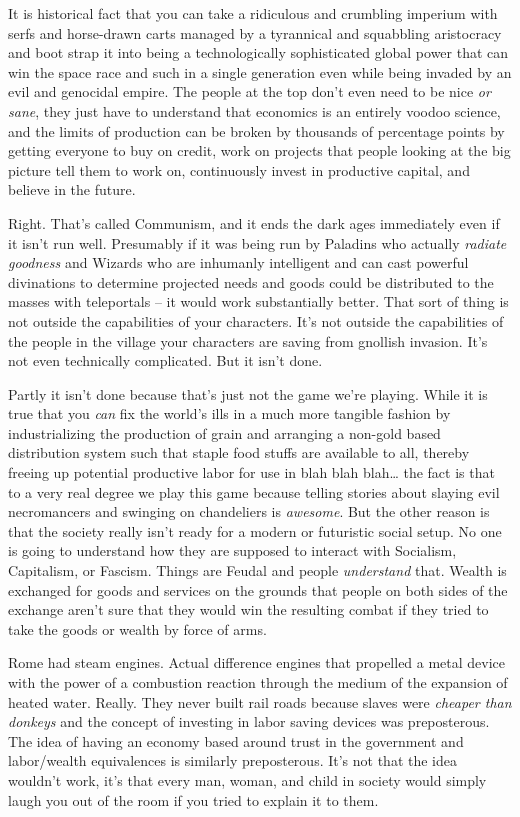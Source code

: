 It is historical fact that you can take a ridiculous and crumbling imperium with serfs and horse-drawn carts managed by a tyrannical and squabbling aristocracy and boot strap it into being a technologically sophisticated global power that can win the space race and such in a single generation even while being invaded by an evil and genocidal empire. The people at the top don't even need to be nice \textit{or sane}, they just have to understand that economics is an entirely voodoo science, and the limits of production can be broken by thousands of percentage points by getting everyone to buy on credit, work on projects that people looking at the big picture tell them to work on, continuously invest in productive capital, and believe in the future.

Right. That's called Communism, and it ends the dark ages immediately even if it isn't run well. Presumably if it was being run by Paladins who actually \textit{radiate goodness} and Wizards who are inhumanly intelligent and can cast powerful divinations to determine projected needs and goods could be distributed to the masses with teleportals -- it would work substantially better. That sort of thing is not outside the capabilities of your characters. It's not outside the capabilities of the people in the village your characters are saving from gnollish invasion. It's not even technically complicated. But it isn't done.

Partly it isn't done because that's just not the game we're playing. While it is true that you \textit{can} fix the world's ills in a much more tangible fashion by industrializing the production of grain and arranging a non-gold based distribution system such that staple food stuffs are available to all, thereby freeing up potential productive labor for use in blah blah blah\ldots{} the fact is that to a very real degree we play this game because telling stories about slaying evil necromancers and swinging on chandeliers is \textit{awesome}. But the other reason is that the society really isn't ready for a modern or futuristic social setup. No one is going to understand how they are supposed to interact with Socialism, Capitalism, or Fascism. Things are Feudal and people \textit{understand} that. Wealth is exchanged for goods and services on the grounds that people on both sides of the exchange aren't sure that they would win the resulting combat if they tried to take the goods or wealth by force of arms.

Rome had steam engines. Actual difference engines that propelled a metal device with the power of a combustion reaction through the medium of the expansion of heated water. Really. They never built rail roads because slaves were \textit{cheaper than donkeys} and the concept of investing in labor saving devices was preposterous. The idea of having an economy based around trust in the government and labor/wealth equivalences is similarly preposterous. It's not that the idea wouldn't work, it's that every man, woman, and child in society would simply laugh you out of the room if you tried to explain it to them.

